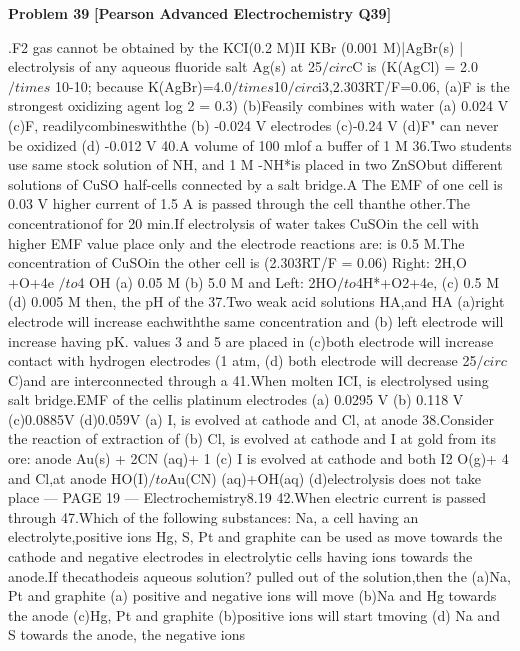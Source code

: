 \begin{problembox}
\textbf{Problem 39} \hfill \textbf{[Pearson Advanced Electrochemistry Q39]}
\label{q:ext-pearson-39}

.F2 gas cannot be obtained by the
KCI(0.2 M)II KBr (0.001 M)|AgBr(s) |
electrolysis of any aqueous fluoride salt
Ag(s) at 25$/circ$C is (K(AgCl) = 2.0 $/times$ 10-10;
because
K(AgBr)=4.0$/times$10$/circ$i3,2.303RT/F=0.06,
(a)F is the strongest oxidizing agent
log 2 = 0.3)
(b)Feasily combines with water
(a) 0.024 V
(c)F, readilycombineswiththe
(b) -0.024 V
electrodes
(c)-0.24 V
(d)F" can never be oxidized
(d) -0.012 V
40.A volume of 100 mlof a buffer of 1 M
36.Two students use same stock solution of
NH, and 1 M -NH*is placed in two
ZnSObut different solutions of CuSO
half-cells connected by a salt bridge.A
The EMF of one cell is 0.03 V higher
current of 1.5 A is passed through the cell
thanthe other.The concentrationof
for 20 min.If electrolysis of water takes
CuSOin the cell with higher EMF value
place only and the electrode reactions are:
is 0.5 M.The concentration of CuSOin
the other cell is (2.303RT/F = 0.06)
Right: 2H,O +O+4e $/to$4 OH
(a) 0.05 M
(b) 5.0 M
and Left: 2HO$/to$4H*+O2+4e,
(c) 0.5 M
(d) 0.005 M
then, the pH of the
37.Two weak acid solutions HA,and HA
(a)right electrode will increase
eachwiththe same concentration and
(b) left electrode will increase
having pK.  values 3 and 5 are placed in
(c)both electrode will increase
contact with hydrogen electrodes (1 atm,
(d) both electrode will decrease
25$/circ$C)and are interconnected through a
41.When molten ICI, is electrolysed using
salt bridge.EMF of the cellis
platinum electrodes
(a) 0.0295 V
(b) 0.118 V
(c)0.0885V
(d)0.059V
(a) I, is evolved at cathode and Cl, at
anode
38.Consider the reaction of extraction of
(b) Cl, is evolved at cathode and I at
gold from its ore:
anode
Au(s) + 2CN (aq)+
1
(c) I is evolved at cathode and both I2
O(g)+
4
and Cl,at anode
HO(I)$/to$Au(CN) (aq)+OH(aq)
(d)electrolysis does not take place
--- PAGE 19 ---
Electrochemistry8.19
42.When electric current is passed through
47.Which of the following substances: Na,
a cell having an electrolyte,positive ions
Hg, S, Pt and graphite can be used as
move towards the cathode and negative
electrodes in electrolytic cells having
ions towards the anode.If thecathodeis
aqueous solution?
pulled out of the solution,then the
(a)Na, Pt and graphite
(a) positive and negative ions will move
(b)Na and Hg
towards the anode
(c)Hg, Pt and graphite
(b)positive ions will
start
tmoving
(d) Na and S
towards the anode, the negative ions
\end{problembox}

